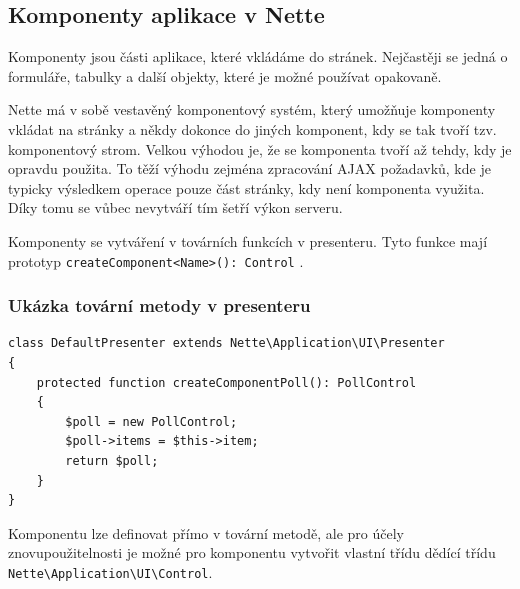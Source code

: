 \documentclass[czech,BP]{thesiskiv}
\begin{document}
		\subsection{Komponenty aplikace v Nette}
		\par Komponenty jsou části aplikace, které vkládáme do stránek. Nejčastěji se jedná o formuláře, tabulky a další objekty, které je možné používat opakovaně.
		\par Nette má v sobě vestavěný komponentový systém, který umožňuje komponenty vkládat na stránky a někdy dokonce do jiných komponent, kdy se tak tvoří tzv. komponentový strom. Velkou výhodou je, že se komponenta tvoří až tehdy, kdy je opravdu použita. To těží výhodu zejména zpracování AJAX požadavků, kde je typicky výsledkem operace pouze část stránky, kdy není komponenta využita. Díky tomu se vůbec nevytváří tím šetří výkon serveru.
		\par Komponenty se vytváření v továrních funkcích v presenteru. Tyto funkce mají prototyp \texttt{createComponent<Name>(): Control} \cite{NetteComponents}.
		
		\subsubsection{Ukázka tovární metody v presenteru}
		\begin{lstlisting}[caption={Ukázka tovární metody v presenteru}]
class DefaultPresenter extends Nette\Application\UI\Presenter
{
	protected function createComponentPoll(): PollControl
	{
		$poll = new PollControl;
		$poll->items = $this->item;
		return $poll;
	}
}
		\end{lstlisting}
		
		\par Komponentu lze definovat přímo v tovární metodě, ale pro účely znovupoužitelnosti je možné pro komponentu vytvořit vlastní třídu dědící třídu \texttt{Nette\textbackslash Application\textbackslash UI\textbackslash Control}.
		
\end{document}
